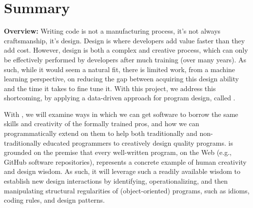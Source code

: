 
\setcounter{section}{1}
\section{Summary \mytitle}

%


{\bf{Overview:}}
%
Writing code is not a manufacturing process, it's not always craftsmanship, it's
design. Design is where developers add value faster than they add cost. However,
design is both a complex and creative process, which can only be effectively
performed by developers after much training (over many years). As such, while it
would seem a natural fit, there is limited work, from a machine learning
perspective, on reducing the gap between acquiring this design ability and the
time it takes to fine tune it. With this project, we address this shortcoming,
by applying a data-driven approach for program design, called \pdm.

With \pdm, we will examine ways in which we can get software to borrow
the same skills and creativity of the formally trained pros, and how
we can programmatically extend on them to help both traditionally and
non-traditionally educated programmers to creatively design quality programs.
\pdm is grounded on the premise that every well-written program, on the
Web (e.g., GitHub software repositories), represents a concrete example
of human creativity and design wisdom. As such, it will leverage such a
readily available wisdom to establish new design interactions by
identifying, operationalizing, and then manipulating structural
regularities of (object-oriented) programs, such as idioms, coding rules,
and design patterns.

